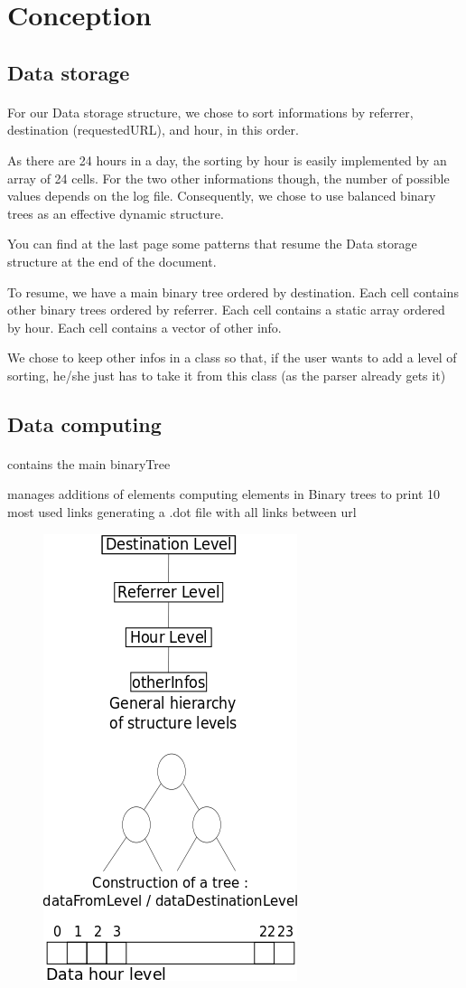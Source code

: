 \documentclass[a4paper, 12pts]{article}
\begin{document}
\section{Conception}
\subsection{Data storage}
\paragraph{}
 For our Data storage structure, we chose to sort informations by referrer, destination (requestedURL), and hour, in this order.

 As there are 24 hours in a day, the sorting by hour is easily implemented by an array of 24 cells. For the two other informations though, the number of possible values depends on the log file. Consequently, we chose to use balanced binary trees as an effective dynamic structure.

You can find at the last page some patterns that resume the Data storage structure at the end of the document.

To resume, we have a main binary tree ordered by destination. Each cell contains other binary trees ordered by referrer. Each cell contains a static array ordered by hour. Each cell contains a vector of other info.

We chose to keep other infos in a class so that, if the user wants to add a level of sorting, he/she just has to take it from this class (as the parser already gets it)
\subsection{Data computing}
\paragraph{}
 contains the main binaryTree

 manages additions of elements
 computing elements in Binary trees to print 10 most used links
 generating a .dot file with all links between url

\newpage

\begin{figure}[t]
\includegraphics{schemas structures.png}
\end{figure}
\end{document}

